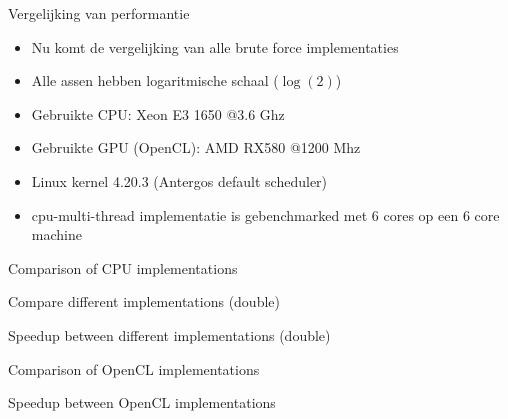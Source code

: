 \documentclass{beamer}
\begin{document}
	\begin{frame}{Vergelijking van performantie}
		\begin{itemize}
			\item Nu komt de vergelijking van alle brute force implementaties
			\item Alle assen hebben logaritmische schaal ($\log(2)$)
			\item Gebruikte CPU: Xeon E3 1650 @3.6 Ghz
			\item Gebruikte GPU (OpenCL): AMD RX580 @1200 Mhz
			\item Linux kernel 4.20.3 (Antergos default scheduler)
			\item cpu-multi-thread implementatie is gebenchmarked met 6 cores op een 6 core machine
		\end{itemize}
	\end{frame}
	
	
	\begin{frame}{Comparison of CPU implementations}
		\begin{center}
			\resizebox{!}{.7\paperheight}{}
		\end{center}
	\end{frame}

	\begin{frame}{Compare different implementations (double)}
		\begin{center}
			\resizebox{!}{.7\paperheight}{}
		\end{center}
	\end{frame}	
	
	\begin{frame}{Speedup between different implementations (double)}
		\begin{center}
			\resizebox{!}{.7\paperheight}{}
		\end{center}
	\end{frame}	
	
	\begin{frame}{Comparison of OpenCL implementations}
		\begin{center}
			\resizebox{!}{.7\paperheight}{}
		\end{center}
	\end{frame}

	\begin{frame}{Speedup between OpenCL implementations}
		\begin{center}
			\resizebox{!}{.7\paperheight}{}
		\end{center}
	\end{frame}
	
\end{document}

